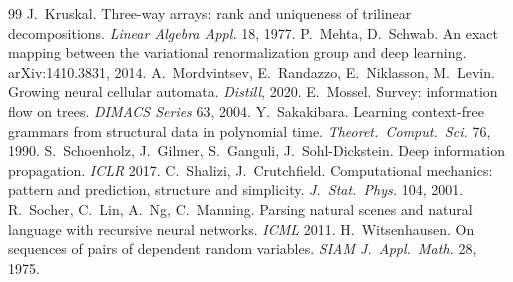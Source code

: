 \documentclass[11pt]{article}
\theoremstyle{definition}
\begin{document}
\begin{thebibliography}{99}
 J.~Kruskal. Three-way arrays: rank and uniqueness of trilinear decompositions. \emph{Linear Algebra Appl.} 18, 1977.
 P.~Mehta, D.~Schwab. An exact mapping between the variational renormalization group and deep learning. arXiv:1410.3831, 2014.
 A.~Mordvintsev, E.~Randazzo, E.~Niklasson, M.~Levin. Growing neural cellular automata. \emph{Distill}, 2020.
 E.~Mossel. Survey: information flow on trees. \emph{DIMACS Series} 63, 2004.
 Y.~Sakakibara. Learning context-free grammars from structural data in polynomial time. \emph{Theoret.\ Comput.\ Sci.} 76, 1990.
 S.~Schoenholz, J.~Gilmer, S.~Ganguli, J.~Sohl-Dickstein. Deep information propagation. \emph{ICLR} 2017.
 C.~Shalizi, J.~Crutchfield. Computational mechanics: pattern and prediction, structure and simplicity. \emph{J.\ Stat.\ Phys.} 104, 2001.
 R.~Socher, C.~Lin, A.~Ng, C.~Manning. Parsing natural scenes and natural language with recursive neural networks. \emph{ICML} 2011.
 H.~Witsenhausen. On sequences of pairs of dependent random variables. \emph{SIAM J.\ Appl.\ Math.} 28, 1975.
\end{thebibliography}
\end{document}
